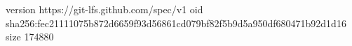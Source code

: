 version https://git-lfs.github.com/spec/v1
oid sha256:fec21111075b872d6659f93d56861cd079bf82f5b9d5a950df680471b92d1d16
size 174880
